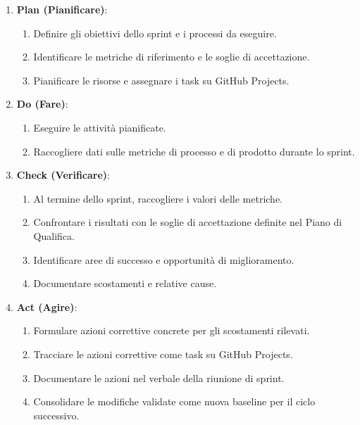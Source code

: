 \documentclass[a4paper, 11pt, oneside]{scrartcl}
\begin{document}
\begin{enumerate}
    \item \textbf{Plan (Pianificare)}:
          \begin{enumerate}[label=\alph*.]
              \item Definire gli obiettivi dello sprint e i processi da eseguire.
              \item Identificare le metriche di riferimento e le soglie di accettazione.
              \item Pianificare le risorse e assegnare i task su GitHub Projects.
          \end{enumerate}
    \item \textbf{Do (Fare)}:
          \begin{enumerate}[label=\alph*.]
              \item Eseguire le attività pianificate.
              \item Raccogliere dati sulle metriche di processo e di prodotto durante lo sprint.
          \end{enumerate}
    \item \textbf{Check (Verificare)}:
          \begin{enumerate}[label=\alph*.]
              \item Al termine dello sprint, raccogliere i valori delle metriche.
              \item Confrontare i risultati con le soglie di accettazione definite nel Piano di Qualifica{\scriptsize{}}.
              \item Identificare aree di successo e opportunità di miglioramento.
              \item Documentare scostamenti e relative cause.
          \end{enumerate}
    \item \textbf{Act (Agire)}:
          \begin{enumerate}[label=\alph*.]
              \item Formulare azioni correttive concrete per gli scostamenti rilevati.
              \item Tracciare le azioni correttive come task su GitHub Projects.
              \item Documentare le azioni nel verbale della riunione di sprint.
              \item Consolidare le modifiche validate come nuova baseline per il ciclo successivo.
          \end{enumerate}
\end{enumerate}
\end{document}
